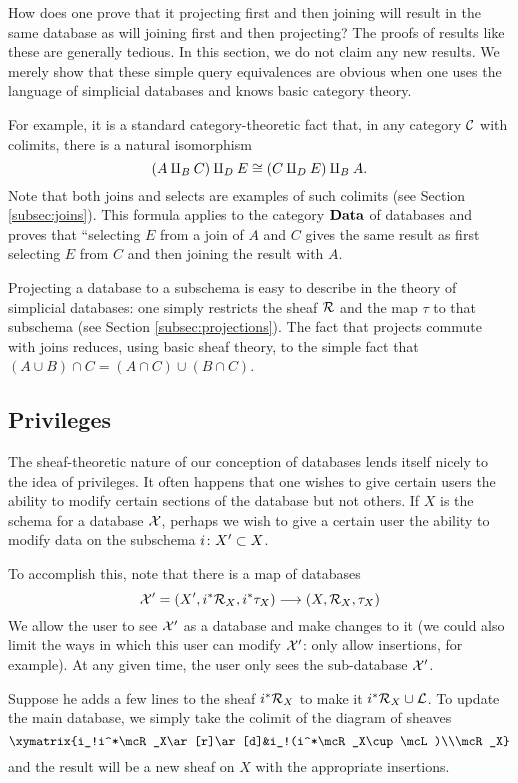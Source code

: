 \documentclass{amsart}
\def\Data{{\bf Data}}
\begin{document}
How does one prove that it projecting first and then joining will result in the same database as will joining first and then projecting?  The proofs of results like these are generally tedious.  In this section, we do not claim any new results.  We merely show that these simple query equivalences are obvious when one uses the language of simplicial databases and knows basic category theory. 

For example, it is a standard category-theoretic fact that, in any category $\mathcal{C}$ with colimits, there is a natural isomorphism $$(A\amalg_BC)\amalg_DE\cong (C\amalg_DE)\amalg_BA.$$  Note that both joins and selects are examples of such colimits (see Section \ref{subsec:joins}).  This formula applies to the category $\Data$ of databases and proves that ``selecting $E$ from a join of $A$ and $C$ gives the same result as first selecting $E$ from $C$ and then joining the result with $A$.

Projecting a database to a subschema is easy to describe in the theory of simplicial databases: one simply restricts the sheaf $\mathcal{R}$ and the map $\tau$ to that subschema (see Section \ref{subsec:projections}).  The fact that projects commute with joins reduces, using basic sheaf theory, to the simple fact that $(A\cup B)\cap C=(A\cap C)\cup (B\cap C)$.  

\subsection{Privileges}\label{subsec:privileges}

The sheaf-theoretic nature of our conception of databases lends itself nicely to the idea of privileges.  It often happens that one wishes to give certain users the ability to modify certain sections of the database but not others.  If $X$ is the schema for a database $\mathcal{X}$, perhaps we wish to give a certain user the ability to modify data on the subschema $i\colon X'\subset X$.  

To accomplish this, note that there is a map of databases $$\mathcal{X}'=(X',i^*\mathcal{R}_X,i^*\tau_X)\longrightarrow(X,\mathcal{R}_X,\tau_X)$$  We allow the user to see $\mathcal{X}'$ as a database and make changes to it (we could also limit the ways in which this user can modify $\mathcal{X}'$: only allow insertions, for example).  At any given time, the user only sees the sub-database $\mathcal{X}'$.  

Suppose he adds a few lines to the sheaf $i^*\mathcal{R}_X$ to make it $i^*\mathcal{R}_X\cup\mathcal{L}$.  To update the main database, we simply take the colimit of the diagram of sheaves $$\xymatrix{i_!i^*\mcR_X\ar[r]\ar[d]&i_!(i^*\mcR_X\cup\mcL)\\\mcR_X}$$ and the result will be a new sheaf on $X$ with the appropriate insertions.  
\end{document}
